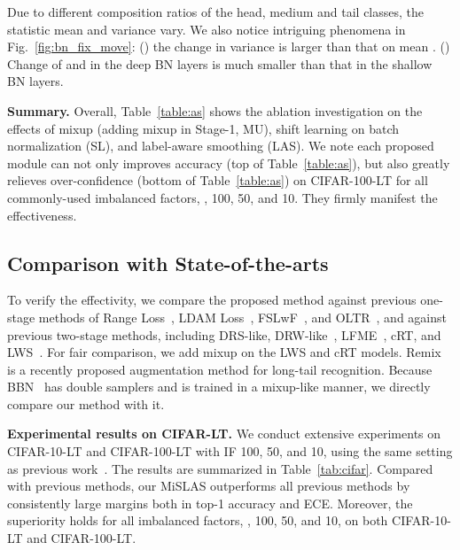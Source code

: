 \documentclass[final]{cvpr}
\begin{document}
	Due to different composition ratios of the head, medium and tail classes, the statistic mean  and variance  vary. We also notice intriguing phenomena in Fig.~\ref{fig:bn_fix_move}: () the change in variance  is larger than that on mean . () Change of  and  in the deep BN layers is much smaller than that in the shallow BN layers.
	
	\vspace{5pt}
	
	\noindent\textbf{Summary.} \quad  Overall, Table~\ref{table:as} shows the ablation investigation on the effects of mixup (adding mixup in Stage-1, MU), shift learning on batch normalization (SL), and label-aware smoothing (LAS). We note each proposed module can not only improves accuracy (top of Table~\ref{table:as}), but also greatly relieves over-confidence (bottom of Table~\ref{table:as}) on CIFAR-100-LT for all commonly-used imbalanced factors, \ie, 100, 50, and 10. They firmly manifest the effectiveness.
	
	
	
	
	
	
	
	


	
	
	


	\subsection{Comparison with State-of-the-arts}

	To verify the effectivity, we compare the proposed method against previous one-stage methods of Range Loss~\cite{zhang2017range}, LDAM Loss~\cite{ldam}, FSLwF~\cite{gidaris2018dynamic}, and OLTR~\cite{liu2019large}, and against previous two-stage methods, including DRS-like, DRW-like~\cite{ldam}, LFME~\cite{xiang2020learning}, cRT, and LWS~\cite{decouple}. For fair comparison, we add mixup on the LWS and cRT models. Remix~\cite{remix} is a recently proposed augmentation method for long-tail recognition. Because BBN~\cite{bbn} has double samplers and is trained in a mixup-like manner, we directly compare our method with it.


	\vspace{6pt}
	\noindent\textbf{Experimental results on CIFAR-LT.} \quad  We conduct extensive experiments on CIFAR-10-LT and CIFAR-100-LT with IF 100, 50, and 10, using the same setting as previous work~\cite{ldam,bbn}. The results are summarized in Table~\ref{tab:cifar}. Compared with previous methods, our MiSLAS outperforms all previous methods by consistently large margins both in top-1 accuracy and ECE. Moreover, the superiority holds for all imbalanced factors, \ie, 100, 50, and 10, on both CIFAR-10-LT and CIFAR-100-LT.
	
\end{document}
